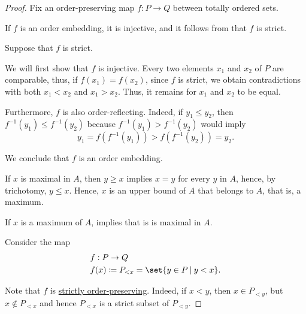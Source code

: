 \begin{proof}
   Fix an order-preserving map \( f: P \to Q \) between totally ordered sets.

  \SufficiencySubProof* If \( f \) is an order embedding, it is injective, and it follows from  that \( f \) is strict.

  \NecessitySubProof* Suppose that \( f \) is strict.

  We will first show that \( f \) is injective. Every two elements \( x_1 \) and \( x_2 \) of \( P \) are comparable, thus, if \( f(x_1) = f(x_2) \), since \( f \) is strict, we obtain contradictions with both \( x_1 < x_2 \) and \( x_1 > x_2 \). Thus, it remains for \( x_1 \) and \( x_2 \) to be equal.

  Furthermore, \( f \) is also order-reflecting. Indeed, if \( y_1 \leq y_2 \), then \( f^{-1}(y_1) \leq f^{-1}(y_2) \) because \( f^{-1}(y_1) > f^{-1}(y_2) \) would imply
  \begin{equation*}
     y_1 = f(f^{-1}(y_1)) > f(f^{-1}(y_2)) = y_2.
  \end{equation*}

  We conclude that \( f \) is an order embedding.


  \SufficiencySubProof* If \( x \) is maximal in \( A \), then \( y \geq x \) implies \( x = y \) for every \( y \) in \( A \), hence, by trichotomy, \( y \leq x \). Hence, \( x \) is an upper bound of \( A \) that belongs to \( A \), that is, a maximum.

  \NecessitySubProof* If \( x \) is a maximum of \( A \),  implies that is is maximal in \( A \).

   Consider the map
  \begin{equation*}
    \begin{aligned}
      &f: P \to Q \\
      &f(x) \coloneqq P_{<x} = \set{ y \in P \given y < x }.
    \end{aligned}
  \end{equation*}

  Note that \( f \) is \hyperref[def:order_function/preserving]{strictly order-preserving}. Indeed, if \( x < y \), then \( x \in P_{<y} \), but \( x \not\in P_{<x} \) and hence \( P_{<x} \) is a strict subset of \( P_{<y} \).


\end{proof}
